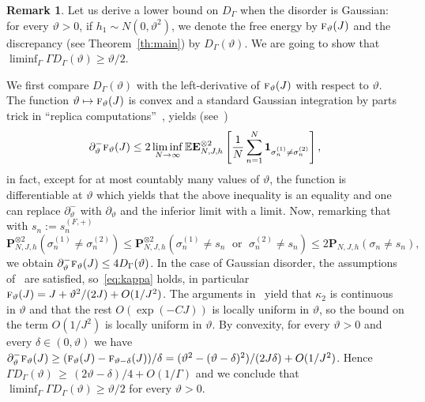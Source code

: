 \documentclass[10pt]{amsart}
\theoremstyle{definition}\newtheorem{defi}[theo]{Definition}\newtheorem{rema}[theo]{Remark}\newtheorem{exam}[theo]{Example}\newtheorem{exem}[theo]{Example}\newtheorem{nota}[theo]{Notation}
\newcommand{\ind}{\mathbf{1}}
\newcommand{\bP}{\mathbf{P}}
\newcommand{\bE}{\mathbf{E}}
\newcommand{\bbE}{\mathbb{E}}
\newcommand{\gd}{\delta}
\newcommand{\gG}{\Gamma}
\newcommand{\gs}{\sigma}
\newcommand{\tf}{\textsc{f}}
\renewcommand*{\to}{\mathchoice{\longrightarrow}{\rightarrow}{\rightarrow}{\rightarrow}}
\let\oldmapsto\mapsto
\renewcommand*{\mapsto}{\mathchoice{\longmapsto}{\oldmapsto}{\oldmapsto}{\oldmapsto}}
\begin{document}
\begin{rema}\label{rem:overlap}
Let us derive a lower bound on $D_\gG$ when the disorder is Gaussian: for every $\vartheta>0$, if $h_1 \sim N(0, \vartheta^2)$, we denote the free energy by $\tf_\vartheta (J)$ and the discrepancy (see Theorem~\ref{th:main}) by $D_\gG(\vartheta)$. We are going to show that $\liminf_\gG \gG D_\gG(\vartheta)\ge \vartheta/2$.

We first compare $D_\gG(\vartheta)$ with the left-derivative of $\tf_\vartheta (J)$ with respect to $\vartheta$. The function $\vartheta \mapsto \tf_\vartheta (J)$ is convex and a standard Gaussian integration by parts trick in ``replica computations''~\cite{cf:Bov}, yields (see~\cite[(C.15)]{cf:CGH1})
\begin{equation}
\partial^-_\vartheta \tf_\vartheta (J) \le 2\liminf_{N \to \infty} \bbE \bE^{\otimes 2}_{N, J, h}\left[\frac1{N} \sum_{n=1}^N
\ind_{ \gs^{(1)}_n\neq \gs^{(2)}_n} \right],
\end{equation}
in fact, except for at most countably many values of $\vartheta$, the function is differentiable at $\vartheta$ which yields that the above inequality is an equality and one can replace $\partial^-_\vartheta$ with $\partial_\vartheta$ and the inferior limit with a limit. Now, remarking that with $s_n:= s^{(F, +)}_n$
\begin{equation}
\bP_{N, J, h}^{\otimes 2}\left(\sigma_n^{(1)}\neq \sigma_n^{(2)}\right)
\le \bP_{N, J, h}^{\otimes 2}\left(\sigma_n^{(1)}\neq s_n \;\text{ or }\; \sigma_n^{(2)}\neq s_n\right)
\le 2 \bP_{N, J, h}\left(\sigma_n\neq s_n\right),
\end{equation}
we obtain $\partial^-_\vartheta \tf_\vartheta (J) \le 4 D_\gG(\vartheta)$. In the case of Gaussian disorder, the assumptions of~\cite{cf:Orphee,cf:GG22} are satisfied, so~\eqref{eq:kappa} holds, in particular $\tf_\vartheta (J)= J+ \vartheta^2/(2J)+ O(1/J^2)$. {The arguments in~\cite{cf:GG22} yield that $\kappa_2$ is continuous in $\vartheta$ and that the rest $O(\exp(-CJ))$ is locally uniform in $\vartheta$, so the bound on the term $O(1/J^2)$ is locally uniform in $\vartheta$}. By convexity, for every $\vartheta>0$ and every $\gd \in (0, \vartheta)$ we have $\partial_{\vartheta}^- \tf_{\vartheta} (J) \ge (\tf_\vartheta (J)- \tf_{\vartheta-\gd} (J))/ \gd = (\vartheta^2- (\vartheta- \gd)^2)/ (2J\gd) + O(1/J^2)$. Hence $\gG D_\gG(\vartheta) \,\ge \, (2\vartheta - \gd)/4+ O(1/ \gG)$ and we conclude that $\liminf_\gG \gG D_\gG(\vartheta)\ge \vartheta/2$ for every $\vartheta>0$.
\end{rema}
\end{document}
